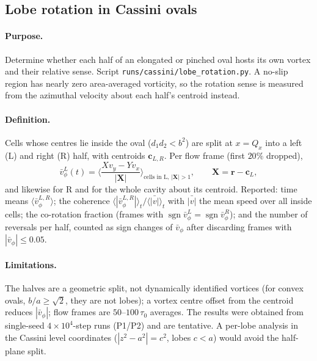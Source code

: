 \subsection{Lobe rotation in Cassini ovals}
\label{sec:md-lobes}

\paragraph{Purpose.} Determine whether each half of an elongated or pinched oval hosts its own vortex and their relative sense.
Script \texttt{runs/cassini/lobe\_rotation.py}. A no-slip region has nearly zero area-averaged vorticity, so the rotation sense is measured
from the azimuthal velocity about each half's centroid instead.
\paragraph{Definition.} Cells whose centres lie inside the oval ($d_1d_2<b^2$) are split at $x=Q_x$ into a left (L) and right (R) half,
with centroids $\mathbf c_{L,R}$. Per flow frame (first $20\%$ dropped),
\begin{equation}
  \bar v_\phi^{L}(t)=\Big\langle\frac{X v_y-Y v_x}{|\mathbf X|}\Big\rangle_{\text{cells in L},\,|\mathbf X|>1},\qquad \mathbf X=\mathbf r-\mathbf c_L,
\end{equation}
and likewise for R and for the whole cavity about its centroid. Reported: time means $\langle\bar v^{L,R}_\phi\rangle$; the coherence
$\langle|\bar v_\phi^{L,R}|\rangle_t/\langle\bar{|v|}\rangle_t$ with $\bar{|v|}$ the mean speed over all inside cells; the co-rotation fraction
(frames with $\operatorname{sgn}\bar v_\phi^L=\operatorname{sgn}\bar v_\phi^R$); and the number of reversals per half, counted as sign changes
of $\bar v_\phi$ after discarding frames with $|\bar v_\phi|\le0.05$.
\paragraph{Limitations.} The halves are a geometric split, not dynamically identified vortices (for convex ovals, $b/a\ge\sqrt2$, they are not
lobes); a vortex centre offset from the centroid reduces $|\bar v_\phi|$; flow frames are $50$--$100\,\tau_0$ averages. The results were
obtained from single-seed $4\times10^4$-step runs (P1/P2) and are tentative. A per-lobe analysis in the Cassini level coordinates
($|z^2-a^2|=c^2$, lobes $c<a$) would avoid the half-plane split.

